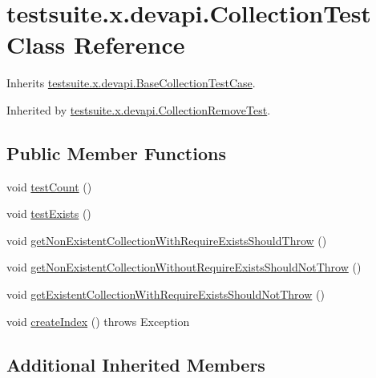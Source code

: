 \hypertarget{classtestsuite_1_1x_1_1devapi_1_1_collection_test}{}\section{testsuite.\+x.\+devapi.\+Collection\+Test Class Reference}
\label{classtestsuite_1_1x_1_1devapi_1_1_collection_test}


Inherits \mbox{\hyperlink{classtestsuite_1_1x_1_1devapi_1_1_base_collection_test_case}{testsuite.\+x.\+devapi.\+Base\+Collection\+Test\+Case}}.



Inherited by \mbox{\hyperlink{classtestsuite_1_1x_1_1devapi_1_1_collection_remove_test}{testsuite.\+x.\+devapi.\+Collection\+Remove\+Test}}.

\subsection*{Public Member Functions}
\begin{DoxyCompactItemize}
\item 
void \mbox{\hyperlink{classtestsuite_1_1x_1_1devapi_1_1_collection_test_a0c5927a5c09f384ad58e21aad4338fb4}{test\+Count}} ()
\item 
void \mbox{\hyperlink{classtestsuite_1_1x_1_1devapi_1_1_collection_test_acf8ab67b83a44279bfa89d3b2b718545}{test\+Exists}} ()
\item 
void \mbox{\hyperlink{classtestsuite_1_1x_1_1devapi_1_1_collection_test_a9e40f1bb484f3441ad46481743b65113}{get\+Non\+Existent\+Collection\+With\+Require\+Exists\+Should\+Throw}} ()
\item 
void \mbox{\hyperlink{classtestsuite_1_1x_1_1devapi_1_1_collection_test_aeb9b2b6d6f0d341c3d672248be38566c}{get\+Non\+Existent\+Collection\+Without\+Require\+Exists\+Should\+Not\+Throw}} ()
\item 
void \mbox{\hyperlink{classtestsuite_1_1x_1_1devapi_1_1_collection_test_ab364d42cc7b9b7fc36f93f3492ea6b92}{get\+Existent\+Collection\+With\+Require\+Exists\+Should\+Not\+Throw}} ()
\item 
void \mbox{\hyperlink{classtestsuite_1_1x_1_1devapi_1_1_collection_test_a44d15ced6846706f7e3f1b1ae7bb8e97}{create\+Index}} ()  throws Exception 
\end{DoxyCompactItemize}
\subsection*{Additional Inherited Members}


